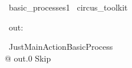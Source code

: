 
\begin{zsection}
  \SECTION\ basic\_processes1 \parents\ circus\_toolkit
\end{zsection}

\begin{circus}
    \circchannel\ out: \nat
\end{circus}

\begin{circus}
    \circprocess\ JustMainActionBasicProcess ~~\circdef~~ \circbegin \\
    @ out.0 \then Skip \\
    \circend
\end{circus}
